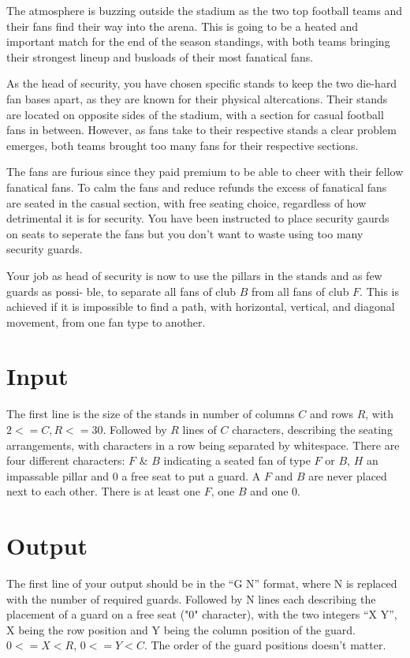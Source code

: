 


\noindent
The atmosphere is buzzing outside the stadium as the two top football teams and their fans find their
way into the arena. This is going to be a heated and important match for the end of the season
standings, with both teams bringing their strongest lineup and busloads of their most fanatical fans.


\noindent
As the head of security, you have chosen specific stands to keep the two die-hard fan bases apart,
as they are known for their physical altercations. Their stands are located on opposite sides of the
stadium, with a section for casual football fans in between. However, as fans take to their respective
stands a clear problem emerges, both teams brought too many fans for their respective sections.

\noindent
The fans are furious since they paid premium to be able to cheer with their fellow fanatical fans.
To calm the fans and reduce refunds the excess of fanatical fans are seated in the casual section, with
free seating choice, regardless of how detrimental it is for security. You have been instructed to place
security gaurds on seats to seperate the fans but you don't want to waste using too many security guards.

\noindent
Your job as head of security is now to use the pillars in the stands and as few guards as possi-
ble, to separate all fans of club $B$ from all fans of club $F$. This is achieved if it is impossible to find a
path, with horizontal, vertical, and diagonal movement, from one fan type to another.

\section*{Input}

The first line is the size of the stands in number of columns $C$ and rows $R$, with $2 <= C,R <= 30$.
Followed by $R$ lines of $C$ characters, describing the seating arrangements, with characters 
in a row being separated by whitespace. There are four different characters: $F$ \& $B$ indicating a seated 
fan of type $F$ or $B$, $H$ an impassable pillar and $0$ a free seat to put a guard.
A $F$ and $B$ are never placed next to each other. There is at least one $F$, one $B$ and one $0$.

\section*{Output}

The first line of your output should be in the “G N” format, where N is replaced with the number of required guards.
Followed by N lines each describing the placement of a guard on a free seat ("0" character), with the two integers “X Y”, X being the row 
position and Y being the column position of the guard. $0 <= X < R$, $0 <= Y < C$. The order of the 
guard positions doesn't matter.
